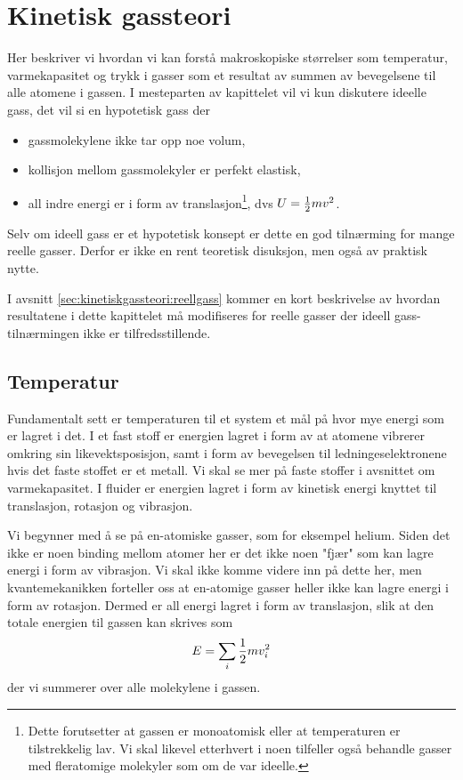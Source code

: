 \section{Kinetisk gassteori}
Her beskriver vi hvordan vi kan forstå makroskopiske størrelser som temperatur, varmekapasitet og trykk i gasser som et resultat av summen av bevegelsene til alle atomene i gassen. I mesteparten av kapittelet vil vi kun diskutere ideelle gass, det vil si en hypotetisk gass der
\begin{itemize}
	\item
	gassmolekylene ikke tar opp noe volum,
	\item
	kollisjon mellom gassmolekyler er perfekt elastisk,
	\item
	all indre energi er i form av translasjon\footnote{Dette forutsetter at gassen er  monoatomisk eller at temperaturen er tilstrekkelig lav. Vi skal likevel etterhvert i noen tilfeller også behandle gasser med fleratomige molekyler som om de var ideelle.}, dvs $U = \frac{1}{2} mv^2$.
\end{itemize}
Selv om ideell gass er et hypotetisk konsept er dette en god tilnærming for mange reelle gasser. Derfor er ikke en rent teoretisk disuksjon, men også av praktisk nytte.

I avsnitt \ref{sec:kinetiskgassteori:reellgass} kommer en kort beskrivelse av hvordan resultatene i dette kapittelet må modifiseres for reelle gasser der ideell gass-tilnærmingen ikke er tilfredsstillende.

\subsection{Temperatur}
\label{sec:kinetiskgassteori:temperatur}
Fundamentalt sett er temperaturen til et system et mål på hvor mye energi som er lagret i det. I et fast stoff er energien lagret i form av at atomene vibrerer omkring sin likevektsposisjon, samt i form av bevegelsen til ledningeselektronene hvis det faste stoffet er et metall. Vi skal se mer på faste stoffer i avsnittet om varmekapasitet. I fluider er energien lagret i form av kinetisk energi knyttet til translasjon, rotasjon og vibrasjon. 

Vi begynner med å se på en-atomiske gasser, som for eksempel helium. Siden det ikke er noen binding mellom atomer her er det ikke noen "fjær" som kan lagre energi i form av vibrasjon. Vi skal ikke komme videre inn på dette her, men kvantemekanikken forteller oss at en-atomige gasser heller ikke kan lagre energi i form av rotasjon. Dermed er all energi lagret i form av translasjon, slik at den totale energien til gassen kan skrives som
\begin{displaymath}
	E = \sum_i \frac{1}{2} mv_i^2
\end{displaymath}
der vi summerer over alle molekylene i gassen.

